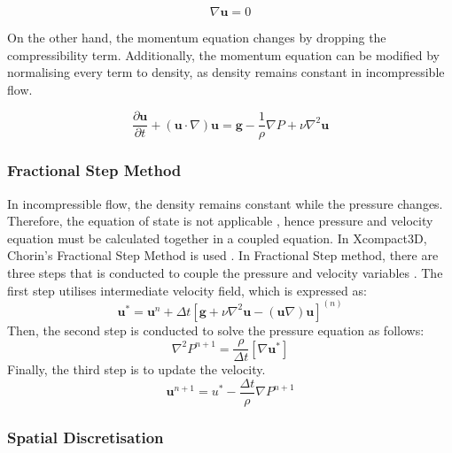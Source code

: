 \begin{equation}
	\nabla \mathbf{u} = 0
\end{equation}

On the other hand, the momentum equation changes by dropping the compressibility term. Additionally, the momentum equation can be modified by normalising every term to density, as density remains constant in incompressible flow.

\begin{equation}
	\frac{\partial\mathbf{u}}{\partial t}+(\mathbf{u}\cdot\nabla)\mathbf{u} = \mathbf{g} - \frac1\rho \nabla P + \nu \nabla^2 \mathbf{u}
\end{equation}



\subsubsection{Fractional Step Method}
\label{sec:Frac_step}
In incompressible flow, the density remains constant while the pressure changes. Therefore, the equation of state is not applicable \cite{Konoszy2024}, hence pressure and velocity equation must be calculated together in a coupled equation. In Xcompact3D, Chorin's Fractional Step Method is used \cite{Laizet2024}. In Fractional Step method, there are three steps that is conducted to couple the pressure and velocity variables \cite{Westra2002}. The first step utilises intermediate velocity field, which is expressed as:
\begin{equation}
	\mathbf{u}^* = \mathbf{u}^{n} + \Delta t \left[\mathbf{g}+\nu\nabla^2\mathbf{u}-(\mathbf{u}\nabla)\mathbf{u}\right]^{(n)}
\end{equation}
Then, the second step is conducted to solve the pressure equation as follows:
\begin{equation}
	\nabla^2 P^{n+1} = \frac{\rho}{\Delta t}\left[\nabla\mathbf{u^*}\right]
\end{equation}
Finally, the third step is to update the velocity.
\begin{equation}
	\mathbf{u}^{n+1}=u^*-\frac{\Delta t}{\rho}\nabla P^{n+1}
\end{equation}


\subsubsection{Spatial Discretisation}



